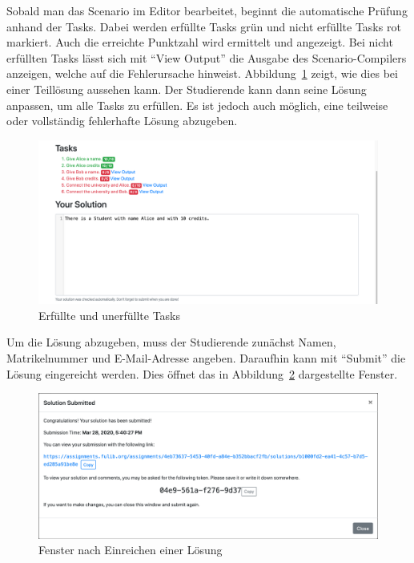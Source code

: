 Sobald man das Scenario im Editor bearbeitet, beginnt die automatische Prüfung anhand der Tasks.
Dabei werden erfüllte Tasks grün und nicht erfüllte Tasks rot markiert.
Auch die erreichte Punktzahl wird ermittelt und angezeigt.
Bei nicht erfüllten Tasks lässt sich mit ``View Output'' die Ausgabe des Scenario-Compilers anzeigen, welche auf die Fehlerursache hinweist.
Abbildung~\ref{fig:solve-tasks} zeigt, wie dies bei einer Teillösung aussehen kann.
Der Studierende kann dann seine Lösung anpassen, um alle Tasks zu erfüllen.
Es ist jedoch auch möglich, eine teilweise oder vollständig fehlerhafte Lösung abzugeben.

\begin{figure}
    \centering
    \includegraphics[width=\textwidth]{chapter/fulib.org/img/solve-tasks.png}
    \caption{Erfüllte und unerfüllte Tasks}
    \label{fig:solve-tasks}
\end{figure}

Um die Lösung abzugeben, muss der Studierende zunächst Namen, Matrikelnummer und E-Mail-Adresse angeben.
Daraufhin kann mit ``Submit'' die Lösung eingereicht werden.
Dies öffnet das in Abbildung~\ref{fig:solution-submitted} dargestellte Fenster.

\begin{figure}
    \centering
    \includegraphics[width=\textwidth]{chapter/fulib.org/img/solution-submitted.png}
    \caption{Fenster nach Einreichen einer Lösung}
    \label{fig:solution-submitted}
\end{figure}

